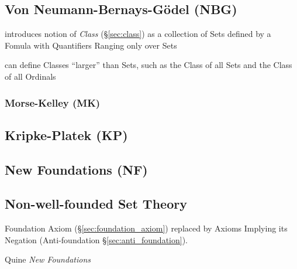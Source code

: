 \subsection{Von Neumann-Bernays-G\"odel (NBG)}\label{sec:nbg_set_theory}

introduces notion of \emph{Class} (\S\ref{sec:class}) as a collection of Sets
defined by a Fomula with Quantifiers Ranging only over Sets

can define Classes ``larger'' than Sets, such as the Class of all Sets and the
Class of all Ordinals



\subsubsection{Morse-Kelley (MK)}\label{sec:mk_set_theory}



\subsection{Kripke-Platek (KP)}\label{sec:kripke_platek}

\subsection{New Foundations (NF)}\label{sec:quine_foundations}

\subsection{Non-well-founded Set Theory}\label{sec:non_wellfounded}

\cite{aczel88}

Foundation Axiom (\S\ref{sec:foundation_axiom}) replaced by Axioms
Implying its Negation (Anti-foundation \S\ref{sec:anti_foundation}).

Quine \emph{New Foundations}

